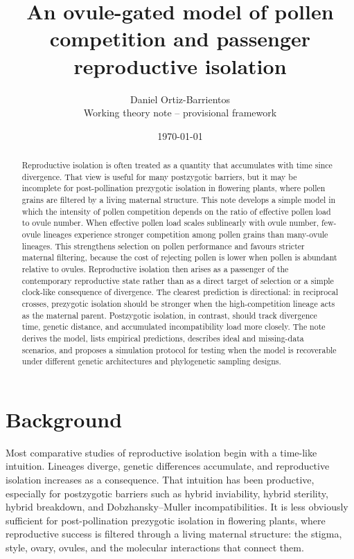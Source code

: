 \documentclass[11pt]{article}
\title{An ovule-gated model of pollen competition and passenger reproductive isolation}
\author{Daniel Ortiz-Barrientos\\
\small Working theory note -- provisional framework}
\date{\today}
\begin{document}
\maketitle

\begin{abstract}
Reproductive isolation is often treated as a quantity that accumulates with time since divergence. That view is useful for many postzygotic barriers, but it may be incomplete for post-pollination prezygotic isolation in flowering plants, where pollen grains are filtered by a living maternal structure. This note develops a simple model in which the intensity of pollen competition depends on the ratio of effective pollen load to ovule number. When effective pollen load scales sublinearly with ovule number, few-ovule lineages experience stronger competition among pollen grains than many-ovule lineages. This strengthens selection on pollen performance and favours stricter maternal filtering, because the cost of rejecting pollen is lower when pollen is abundant relative to ovules. Reproductive isolation then arises as a passenger of the contemporary reproductive state rather than as a direct target of selection or a simple clock-like consequence of divergence. The clearest prediction is directional: in reciprocal crosses, prezygotic isolation should be stronger when the high-competition lineage acts as the maternal parent. Postzygotic isolation, in contrast, should track divergence time, genetic distance, and accumulated incompatibility load more closely. The note derives the model, lists empirical predictions, describes ideal and missing-data scenarios, and proposes a simulation protocol for testing when the model is recoverable under different genetic architectures and phylogenetic sampling designs.
\end{abstract}

\section{Background}

Most comparative studies of reproductive isolation begin with a time-like intuition. Lineages diverge, genetic differences accumulate, and reproductive isolation increases as a consequence. That intuition has been productive, especially for postzygotic barriers such as hybrid inviability, hybrid sterility, hybrid breakdown, and Dobzhansky--Muller incompatibilities. It is less obviously sufficient for post-pollination prezygotic isolation in flowering plants, where reproductive success is filtered through a living maternal structure: the stigma, style, ovary, ovules, and the molecular interactions that connect them.
\end{document}
